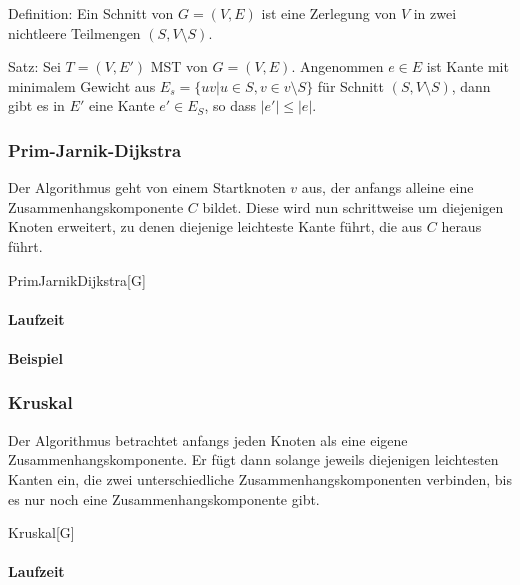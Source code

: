 Definition: Ein Schnitt von $G = (V, E)$ ist eine Zerlegung von $V$ in zwei nichtleere Teilmengen $(S, V \setminus S)$.

Satz: Sei $T = (V, E')$ MST von $G = (V, E)$.
Angenommen $e \in E$ ist Kante mit minimalem Gewicht aus $E_{s} = \{uv | u \in S, v \in v\setminus S\}$ für Schnitt $(S, V \setminus S)$,
dann gibt es in $E'$ eine Kante $e' \in E_{S}$, so dass $|e'| \leq |e|$.

\subsubsection{Prim-Jarnik-Dijkstra}
\label{subsubsec:PrimJarnikDijkstra}

Der Algorithmus geht von einem Startknoten $v$ aus,
der anfangs alleine eine Zusammenhangskomponente $C$ bildet.
Diese wird nun schrittweise um diejenigen Knoten erweitert,
zu denen diejenige leichteste Kante führt, die aus $C$ heraus führt.

\begin{algorithm}{PrimJarnikDijkstra}[G]{
	\qinput{}
	\qoutput{}
}
\end{algorithm}

\paragraph{Laufzeit}

\paragraph{Beispiel}

\subsubsection{Kruskal}
\label{subsubsec:Kruskal}

Der Algorithmus betrachtet anfangs jeden Knoten als eine eigene Zusammenhangskomponente.
Er fügt dann solange jeweils diejenigen leichtesten Kanten ein,
die zwei unterschiedliche Zusammenhangskomponenten verbinden,
bis es nur noch eine Zusammenhangskomponente gibt.

\begin{algorithm}{Kruskal}[G]{
	\qinput{}
	\qoutput{}
}
\end{algorithm}

\paragraph{Laufzeit}

